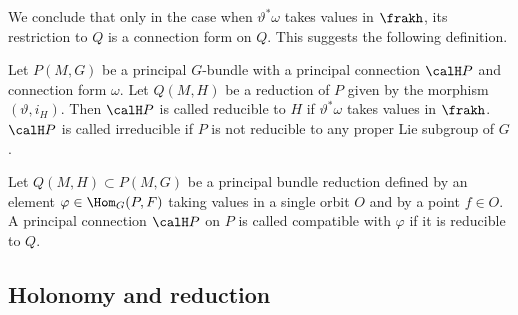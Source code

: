 We conclude that only in the case when $\vartheta^\ast\omega$ takes values in $\frakh$, its restriction to $Q$ is a connection form on $Q$. This suggests the following definition.

\begin{defn}
    Let $P(M,G)$ be a principal $G$-bundle with a principal connection $\calH P$ and connection form $\omega$. Let $Q(M,H)$ be a reduction of $P$ given by the morphism $(\vartheta,i_H)$. Then $\calH P$ is called reducible to $H$ if $\vartheta^\ast\omega$ takes values in $\frakh$. $\calH P$ is called irreducible if $P$ is not reducible to any proper Lie subgroup of $G$.
\end{defn}


\begin{defn}\label{def compatible connection}
    Let $Q(M,H)\subset P(M,G)$ be a principal bundle reduction defined by an element $\varphi\in \Hom_G(P,F)$ taking values in a single orbit $O$ and by a point $f\in O$. A principal connection $\calH P$ on $P$ is called compatible with $\varphi$ if it is reducible to $Q$.
\end{defn}









\subsection{Holonomy and reduction}\label{sec holonomy}

